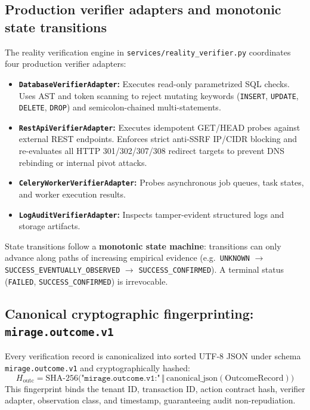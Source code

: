 \documentclass[11pt,a4paper]{article}
\newcommand{\fp}[1]{\texttt{\scriptsize #1}}
\begin{document}
\subsection{Production verifier adapters and monotonic state transitions}
The reality verification engine in \fp{services/reality\_verifier.py} coordinates four production verifier adapters:
\begin{itemize}[leftmargin=*,itemsep=1pt]
  \item \textbf{\texttt{DatabaseVerifierAdapter}:} Executes read-only parametrized SQL checks. Uses AST and token scanning to reject mutating keywords (\texttt{INSERT}, \texttt{UPDATE}, \texttt{DELETE}, \texttt{DROP}) and semicolon-chained multi-statements.
  \item \textbf{\texttt{RestApiVerifierAdapter}:} Executes idempotent GET/HEAD probes against external REST endpoints. Enforces strict anti-SSRF IP/CIDR blocking and re-evaluates all HTTP 301/302/307/308 redirect targets to prevent DNS rebinding or internal pivot attacks.
  \item \textbf{\texttt{CeleryWorkerVerifierAdapter}:} Probes asynchronous job queues, task states, and worker execution results.
  \item \textbf{\texttt{LogAuditVerifierAdapter}:} Inspects tamper-evident structured logs and storage artifacts.
\end{itemize}

State transitions follow a \textbf{monotonic state machine}: transitions can only advance along paths of increasing empirical evidence (e.g.\ \texttt{UNKNOWN} $\rightarrow$ \texttt{SUCCESS\_EVENTUALLY\_OBSERVED} $\rightarrow$ \texttt{SUCCESS\_CONFIRMED}). A terminal status (\texttt{FAILED}, \texttt{SUCCESS\_CONFIRMED}) is irrevocable.

\subsection{Canonical cryptographic fingerprinting: \texttt{mirage.outcome.v1}}
Every verification record is canonicalized into sorted UTF-8 JSON under schema \texttt{mirage.outcome.v1} and cryptographically hashed:
\begin{equation}
H_{\text{outc}}=\mathrm{SHA\text{-}256}\big(\texttt{"mirage.outcome.v1:"}\,\Vert\,\text{canonical\_json}(\text{OutcomeRecord})\big)
\end{equation}
This fingerprint binds the tenant ID, transaction ID, action contract hash, verifier adapter, observation class, and timestamp, guaranteeing audit non-repudiation.
\end{document}
